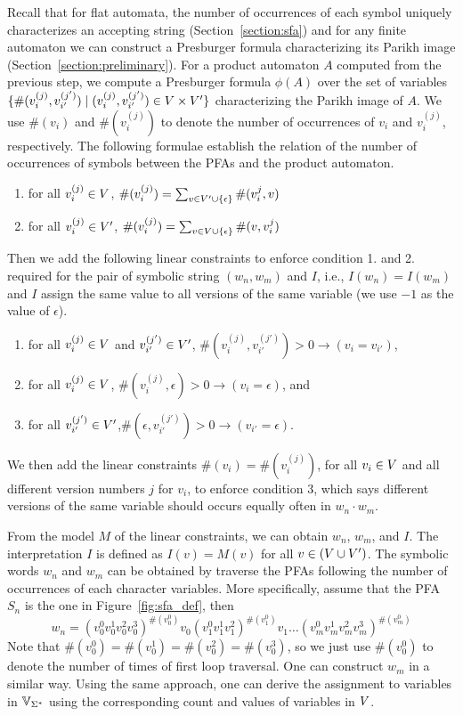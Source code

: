 \documentclass[sigplan,review,anonymous]{acmart}\settopmatter{printfolios=true,printccs=false,printacmref=false}
\begin{document}
Recall that for flat automata, the number of occurrences of each symbol uniquely characterizes an accepting string (Section~\ref{section:sfa}) and for any finite automaton we can construct a Presburger formula characterizing its Parikh image (Section~\ref{section:preliminary}). For a product automaton $A$ computed from the previous step, we compute a Presburger formula $\phi(A)$ over the set of variables $\{\#{(v_i^{(j)},v_{i'}^{(j')})}\mid (v_i^{(j)},v_{i'}^{(j')}) \in V \times V'\}$ characterizing the Parikh image of $A$. We use $\#(v_i)$ and $\#(v_i^{(j)})$ to denote the number of occurrences of $v_i$ and $v_i^{(j)}$, respectively. The following formulae establish the relation of the number of occurrences of symbols between the PFAs and the product automaton.
\begin{enumerate}
	\item for all $v_i^{(j)} \in V$, $\#(v_i^{(j)}) = \sum_{v \in {V'\cup \{\epsilon\}}} \#{(v_i^{j},v)}$   
	\item for all $v_i^{(j)} \in V'$, $\#(v_i^{(j)}) = \sum_{v \in {V\cup \{\epsilon\}}} \#{(v,v_i^{j})}$ 
\end{enumerate}

Then we add the following linear constraints to enforce  condition 1. and 2. required for the pair of symbolic string $(w_n, w_m)$ and $I$, i.e., $I(w_n) = I(w_m)$ and $I$ assign the same value to all versions of the same variable (we use $-1$ as the value of $\epsilon$). 
\begin{enumerate}
	\item for all $v_i^{(j)}\in V$ and $v_{i'}^{(j')}\in V'$, $\#{(v_i^{(j)},v_{i'}^{(j')})}>0 \rightarrow (v_i=v_{i'})$, 
	\item for all $v_i^{(j)}\in V$, $\#{(v_i^{(j)},\epsilon)}>0 \rightarrow (v_i=\epsilon)$, and
	\item for all $v_{i'}^{(j')}\in V'$,$\#{(\epsilon,v_{i'}^{(j')})}>0 \rightarrow (v_{i'}=\epsilon)$.
\end{enumerate}
We then add the linear constraints $\#(v_i) = \#(v_i^{(j)})$, for all $v_i\in V$ and all different version numbers $j$ for $v_i$, to enforce condition 3, which says different versions of the same variable should occurs equally often in $w_n\cdot w_m$. 

From the model $M$ of the linear constraints, we can obtain $w_n$, $w_m$, and $I$. The interpretation $I$ is defined as $I(v)=M(v)$ for all $v\in (V \cup V')$. The symbolic words $w_n$ and $w_m$ can be obtained by traverse the PFAs following the number of occurrences of each character variables.
More specifically, assume that the PFA $S_n$ is the one in Figure~\ref{fig:sfa_def}, then $$w_n = (v_0^0v_0^1v_0^2v_0^3)^{\#(v_0^0)}v_0(v_1^0v_1^1v_1^2)^{\#(v_1^0)}v_1\ldots(v_m^0v_m^1v_m^2v_m^3)^{\#(v_m^0)}$$
Note that $\#(v_0^0)=\#(v_0^1)=\#(v_0^2)=\#(v_0^3)$, so we just use $\#(v_0^0)$ to denote the number of times of first loop traversal. One can construct $w_m$ in a similar way. Using the same approach, one can derive the assignment to variables in $\mbox{$\mathbb{V}_{\Sigma^*}$}$ using the corresponding count and values of variables in $V$.
\end{document}
